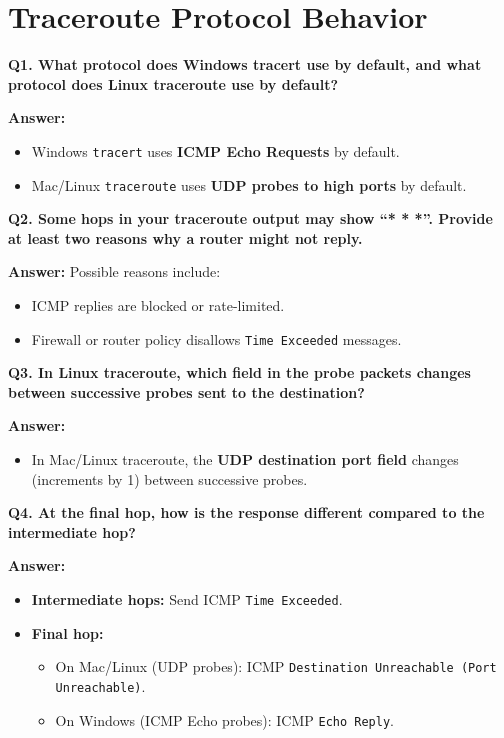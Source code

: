 \documentclass[12pt, a4paper]{report}
\begin{document}
\chapter{Traceroute Protocol Behavior}

\textbf{Q1. What protocol does Windows tracert use by default, and what protocol does Linux traceroute use by default?}

\textbf{Answer:}  
\begin{itemize}[leftmargin=*]
    \item Windows \texttt{tracert} uses \textbf{ICMP Echo Requests} by default.
    \item Mac/Linux \texttt{traceroute} uses \textbf{UDP probes to high ports} by default.
\end{itemize}

\textbf{Q2. Some hops in your traceroute output may show ``* * *''. Provide at least two reasons why a router might not reply.}

\textbf{Answer:}  
Possible reasons include:
\begin{itemize}[leftmargin=*]
    \item ICMP replies are blocked or rate-limited.  
    \item Firewall or router policy disallows \texttt{Time Exceeded} messages.  
\end{itemize}

\textbf{Q3. In Linux traceroute, which field in the probe packets changes between successive probes sent to the destination?}

\textbf{Answer:}  
\begin{itemize}[leftmargin=*]
    \item In Mac/Linux traceroute, the \textbf{UDP destination port field} changes (increments by 1) between successive probes.  
\end{itemize}

\textbf{Q4. At the final hop, how is the response different compared to the intermediate hop?}

\textbf{Answer:}  
\begin{itemize}[leftmargin=*]
    \item \textbf{Intermediate hops:} Send ICMP \texttt{Time Exceeded}.  
    \item \textbf{Final hop:}  
    \begin{itemize}
        \item On Mac/Linux (UDP probes): ICMP \texttt{Destination Unreachable (Port Unreachable)}.  
        \item On Windows (ICMP Echo probes): ICMP \texttt{Echo Reply}.  
    \end{itemize}
\end{itemize}
\end{document}
